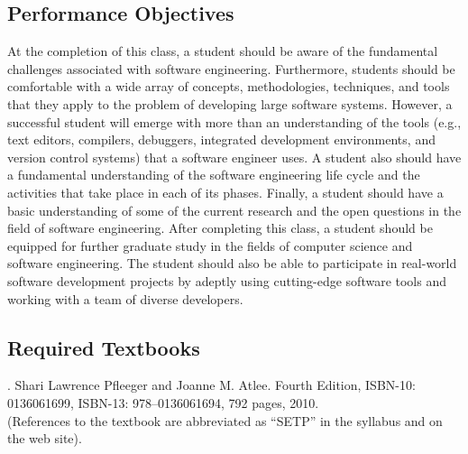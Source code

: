 \documentclass[11pt]{article}
\begin{document}
\subsection*{Performance Objectives}

At the completion of this class, a student should be aware of the fundamental challenges associated with software
engineering. Furthermore, students should be comfortable with a wide array of concepts, methodologies, techniques, and
tools that they apply to the problem of developing large software systems. However, a successful student will emerge
with more than an understanding of the tools (e.g., text editors, compilers, debuggers, integrated development
environments, and version control systems) that a software engineer uses. A student also should have a fundamental
understanding of the software engineering life cycle and the activities that take place in each of its phases. Finally,
a student should have a basic understanding of some of the current research and the open questions in the field of
software engineering. After completing this class, a student should be equipped for further graduate study in the fields
of computer science and software engineering. The student should also be able to participate in real-world software
development projects by adeptly using cutting-edge software tools and working with a team of diverse developers.

\subsection*{Required Textbooks}


. Shari Lawrence Pfleeger and Joanne M. Atlee.
Fourth Edition, ISBN-10: 0136061699, ISBN-13: 978--0136061694, 792 pages, 2010. \\
(References to the textbook are abbreviated as ``SETP'' in the syllabus and on the web site).

\end{document}
